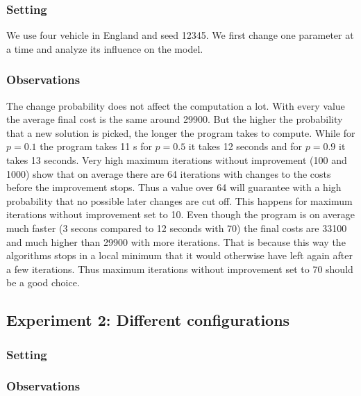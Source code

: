 \documentclass[11pt]{article}
\begin{document}
\subsubsection{Setting}
We use four vehicle in England and seed 12345. We first change one parameter at a time and analyze its influence on the model.

\subsubsection{Observations}
The change probability does not affect the computation a lot. With every value the average final cost is the same around 29900. But the higher the probability that a new solution is picked, the longer the program takes to compute. While for $p=0.1$ the program takes 11 s for $p=0.5$ it takes 12 seconds and for $p=0.9$ it takes 13 seconds. 
Very high maximum iterations without improvement (100 and 1000) show that on average there are 64 iterations with changes to the costs before the improvement stops. Thus a value over 64 will guarantee with a high probability that no possible later changes are cut off. This happens for maximum iterations without improvement set to 10. Even though the program is on average much faster (3 secons compared to 12 seconds with 70) the final costs are 33100 and much higher than 29900 with more iterations. That is because this way the algorithms stops in a local minimum that it would otherwise have left again after a few iterations. Thus maximum iterations without improvement set to 70 should be a good choice.


\subsection{Experiment 2: Different configurations}

\subsubsection{Setting}

\subsubsection{Observations}
\end{document}
